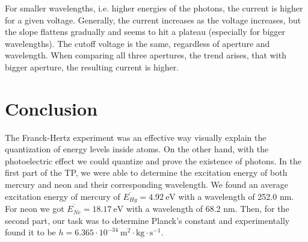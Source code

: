 \documentclass{scrartcl}
\begin{document}
\noindent For smaller wavelengths, i.e. higher energies of the photons, the current is higher for a given voltage. Generally, the current increases as the voltage increases, but the slope flattens gradually and seems to hit a plateau (especially for bigger wavelengths). The cutoff voltage is the same, regardless of aperture and wavelength. When comparing all three apertures, the trend arises, that with bigger aperture, the resulting current is higher.

\section{Conclusion}

The Franck-Hertz experiment was an effective way visually explain the quantization of energy levels inside atoms. On the other hand, with the photoelectric effect we could quantize and prove the existence of photons. In the first part of the TP, we were able to determine the excitation energy of both mercury and neon and their corresponding wavelength. We found an average excitation energy of mercury of $\overline{E_{Hg}}=4.92 \ \text{eV}$ with a wavelength of 252.0 nm. For neon we got $\overline{E_{Ne}}=18.17 \ \text{eV}$ with a wavelength of 68.2 nm. Then, for the second part, our task was to determine Planck's constant and experimentally found it to be $h = 6.365 \cdot 10^{-34} \ \text{m}^2 \cdot \text{kg}\cdot \text{s}^{-1}$. 
\end{document}

